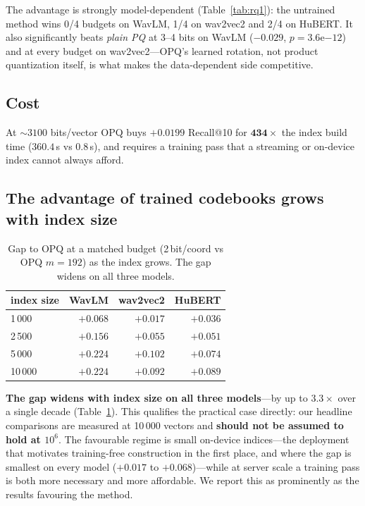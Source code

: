 \documentclass[conference]{IEEEtran}
\begin{document}
The advantage is strongly model-dependent (Table~\ref{tab:rq1}): the untrained method wins 0/4
budgets on WavLM, 1/4 on wav2vec2 and 2/4 on HuBERT. It also significantly beats \emph{plain PQ} at
3--4 bits on WavLM ($-0.029$, $p{=}3.6\mathrm{e}{-12}$) and at every budget on wav2vec2---OPQ's
learned rotation, not product quantization itself, is what makes the data-dependent side
competitive.

\subsection{Cost}

At ${\sim}3100$ bits/vector OPQ buys $+0.0199$ Recall@10 for $\mathbf{434\times}$ the index build
time ($360.4$\,s vs $0.8$\,s), and requires a training pass that a streaming or on-device index
cannot always afford.

\subsection{The advantage of trained codebooks grows with index size}
\label{sec:scale}

\begin{table}[t]
\centering
\caption{Gap to OPQ at a matched budget (2\,bit/coord vs OPQ $m{=}192$) as the index grows. The gap
widens on all three models.}
\label{tab:scale}
\begin{tabular}{lrrr}
\toprule
index size & WavLM & wav2vec2 & HuBERT \\
\midrule
1\,000 & $+0.068$ & $\mathbf{+0.017}$ & $+0.036$ \\
2\,500 & $+0.156$ & $+0.055$ & $+0.051$ \\
5\,000 & $+0.224$ & $+0.102$ & $+0.074$ \\
10\,000 & $+0.224$ & $+0.092$ & $+0.089$ \\
\bottomrule
\end{tabular}
\end{table}

\textbf{The gap widens with index size on all three models}---by up to $3.3\times$ over a single
decade (Table~\ref{tab:scale}). This qualifies the practical case directly: our headline
comparisons are measured at 10\,000 vectors and \textbf{should not be assumed to hold at $10^6$}.
The favourable regime is small on-device indices---the deployment that motivates training-free
construction in the first place, and where the gap is smallest on every model ($+0.017$ to
$+0.068$)---while at server scale a training pass is both more necessary and more affordable. We
report this as prominently as the results favouring the method.
\end{document}
